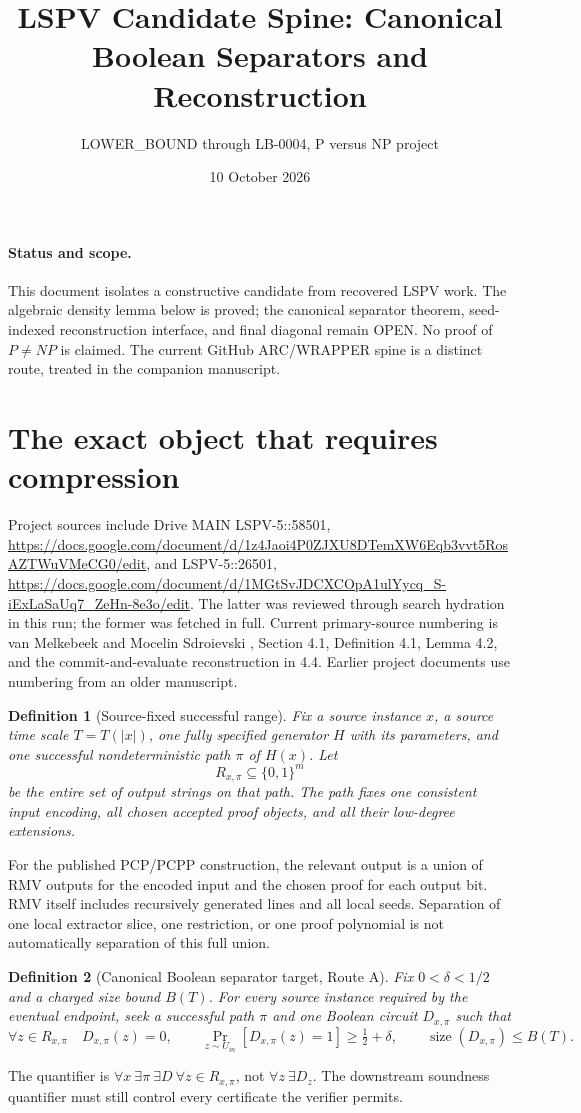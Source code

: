 \documentclass[11pt]{article}
\title{LSPV Candidate Spine: Canonical Boolean Separators and Reconstruction}
\author{LOWER\_BOUND through LB-0004, P versus NP project}
\date{10 October 2026}
\newtheorem{definition}{Definition}
\begin{document}
\maketitle
\paragraph{Status and scope.}
This document isolates a constructive candidate from recovered LSPV work.
The algebraic density lemma below is proved; the canonical separator
theorem, seed-indexed reconstruction interface, and final diagonal remain
OPEN. No proof of $P\ne NP$ is claimed. The current GitHub ARC/WRAPPER
spine is a distinct route, treated in the companion manuscript.

\section{The exact object that requires compression}
Project sources include Drive MAIN LSPV-5::58501,
\url{https://docs.google.com/document/d/1z4Jaoi4P0ZJXU8DTemXW6Eqb3vvt5RosAZTWuVMeCG0/edit},
and LSPV-5::26501,
\url{https://docs.google.com/document/d/1MGtSvJDCXCOpA1ulYycq_S-iExLaSaUq7_ZeHn-8e3o/edit}.
The latter was reviewed through search hydration in this run; the former
was fetched in full. Current primary-source numbering is van Melkebeek
and Mocelin Sdroievski \cite{vms2025}, Section 4.1, Definition 4.1,
Lemma 4.2, and the commit-and-evaluate reconstruction in 4.4.
Earlier project documents use numbering from an older manuscript.

\begin{definition}[Source-fixed successful range]
Fix a source instance $x$, a source time scale $T=T(|x|)$,
one fully specified generator $H$ with its parameters, and one successful
nondeterministic path $\pi$ of $H(x)$. Let
\[
 R_{x,\pi}\subseteq\{0,1\}^{m}
\]
be the entire set of output strings on that path.
The path fixes one consistent input encoding, all chosen accepted proof
objects, and all their low-degree extensions.
\end{definition}
For the published PCP/PCPP construction, the relevant output is a union
of RMV outputs for the encoded input and the chosen proof for each output
bit. RMV itself includes recursively generated lines and all local seeds.
Separation of one local extractor slice, one restriction, or one proof
polynomial is not automatically separation of this full union.

\begin{definition}[Canonical Boolean separator target, Route A]
Fix $0<\delta<1/2$ and a charged size bound $B(T)$.
For every source instance required by the eventual endpoint, seek a
successful path $\pi$ and one Boolean circuit $D_{x,\pi}$ such that
\[
 \forall z\in R_{x,\pi}\quad D_{x,\pi}(z)=0,\qquad
 \Pr_{z\sim U_m}[D_{x,\pi}(z)=1]\ge \tfrac12+\delta,\qquad
 \operatorname{size}(D_{x,\pi})\le B(T).
\]
\end{definition}
The quantifier is $\forall x\ \exists\pi\ \exists D\ \forall z\in R_{x,\pi}$,
not $\forall z\ \exists D_z$. The downstream soundness quantifier
must still control every certificate the verifier permits.
\end{document}
